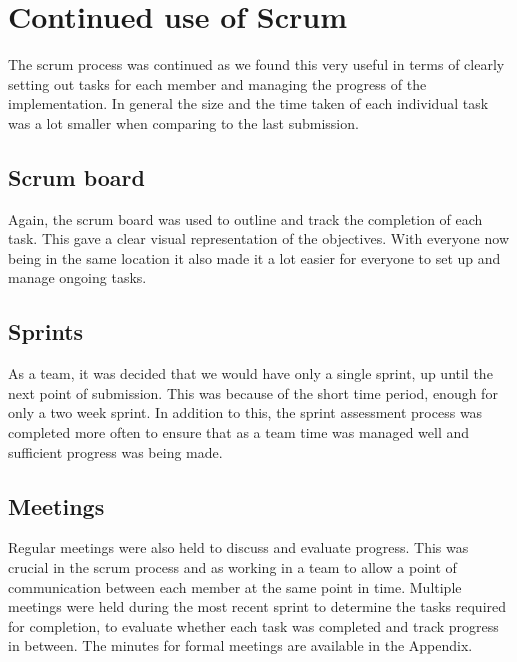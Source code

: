 \section{Continued use of Scrum}
The scrum process was continued as we found this very useful in terms of clearly setting out tasks for each member and managing the progress of the implementation. In general the size and the time taken of each individual task was a lot smaller when comparing to the last submission. 
\subsection{Scrum board}
Again, the scrum board was used to outline and track the completion of each task. This gave a clear visual representation of the objectives. With everyone now being in the same location it also made it a lot easier for everyone to set up and manage ongoing tasks.
\subsection{Sprints}
As a team, it was decided that we would have only a single sprint, up until the next point of submission. This was because of the short time period, enough for only a two week sprint. In addition to this, the sprint assessment process was completed more often to ensure that as a team time was managed well and sufficient progress was being made. 
\subsection{Meetings}
Regular meetings were also held to discuss and evaluate progress. This was crucial in the scrum process and as working in a team to allow a point of communication between each member at the same point in time. Multiple meetings were held during the most recent sprint to determine the tasks required for completion, to evaluate whether each task was completed and track progress in between. 
The minutes for formal meetings are available in the Appendix.
